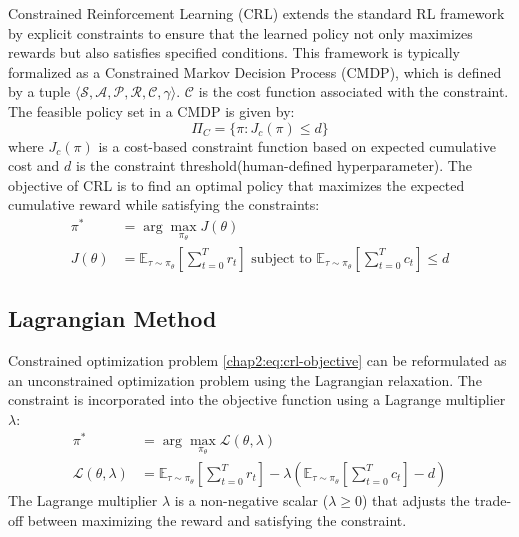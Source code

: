 Constrained Reinforcement Learning (CRL) extends the standard RL framework by explicit constraints to ensure that the learned policy not only maximizes rewards but also satisfies specified conditions.
This framework is typically formalized as a Constrained Markov Decision Process (CMDP), which is defined by a tuple $\langle \mathcal{S}, \mathcal{A}, \mathcal{P}, \mathcal{R}, \mathcal{C}, \gamma \rangle$.
$\mathcal{C}$ is the cost function associated with the constraint.
The feasible policy set in a CMDP is given by:
\begin{equation}
  \Pi_C = \{\pi: J_c(\pi) \leq d \}
\end{equation}
where $J_c(\pi)$ is a cost-based constraint function based on expected cumulative cost and $d$ is the constraint threshold(human-defined hyperparameter).
The objective of CRL is to find an optimal policy that maximizes the expected cumulative reward while satisfying the constraints:
\begin{equation} \label{chap2:eq:crl-objective}
  \begin{aligned}
    \pi^* &= \arg\max_{\pi_\theta} J(\theta) \\
    J(\theta) &= \mathbb{E}_{\tau \sim \pi_\theta} \left[ \sum^T_{t = 0} r_t \right] \text{ subject to } \mathbb{E}_{\tau \sim \pi_\theta} \left[ \sum^T_{t = 0} c_t \right] \leq d
  \end{aligned}
\end{equation}

\subsection{Lagrangian Method}

Constrained optimization problem \eqref{chap2:eq:crl-objective} can be reformulated as an unconstrained optimization problem using the Lagrangian relaxation.
The constraint is incorporated into the objective function using a Lagrange multiplier $\lambda$:
\begin{equation}
  \begin{aligned}
    \pi^* &= \arg\max_{\pi_\theta} \mathcal{L}(\theta, \lambda) \\
    \mathcal{L}(\theta, \lambda) &= \mathbb{E}_{\tau \sim \pi_\theta} \left[ \sum^T_{t = 0} r_t \right] - \lambda \left( \mathbb{E}_{\tau \sim \pi_\theta} \left[ \sum^T_{t = 0} c_t \right] - d \right)
  \end{aligned}
\end{equation}
The Lagrange multiplier $\lambda$ is a non-negative scalar ($\lambda \geq 0$) that adjusts the trade-off between maximizing the reward and satisfying the constraint.

